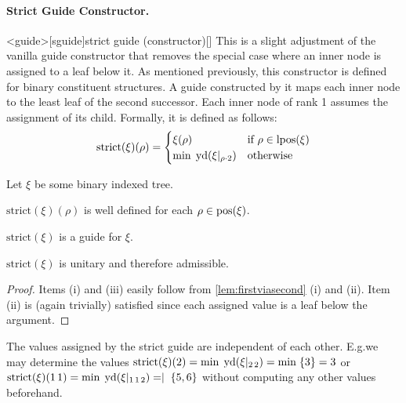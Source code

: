 \documentclass[../../document.tex]{subfiles}
\begin{document}
    \paragraph{Strict Guide Constructor.}<guide>[sguide]{strict guide (constructor)}[]
    This is a slight adjustment of the vanilla guide constructor that removes the special case where an inner node is assigned to a leaf below it.
    As mentioned previously, this constructor is defined for binary constituent structures.
    A guide constructed by it maps each inner node to the least leaf of the second successor.
    Each inner node of rank 1 assumes the assignment of its child.
    Formally, it is defined as follows:
    \[
    \mathrm{strict}(\xi)(\rho) = \begin{cases}
        \xi(\rho)   & \text{if $\rho \in \operatorname{lpos}(\xi)$}\\
        \min\;\operatorname{yd}(\xi|_{\rho\cdot 2}) &\text{otherwise}
    \end{cases}
    \]

    \begin{theorem}
        Let \(\xi\) be some binary indexed tree.
        \begin{compactenum}
            \item \(\mathrm{strict}(\xi)(\rho)\) is well defined for each \(\rho \in \operatorname{pos}(\xi)\).
            \item \(\mathrm{strict}(\xi)\) is a guide for \(\xi\).
            \item \(\mathrm{strict}(\xi)\) is unitary and therefore admissible.
        \end{compactenum}
    \end{theorem}

    \begin{proof}
        Items (i) and (iii) easily follow from \cref{lem:firstviasecond} (i) and (ii).
        Item (ii) is (again trivially) satisfied since each assigned value is a leaf below the argument.
    \end{proof}

    \begin{example}
        The values assigned by the strict guide are independent of each other.
        E.g.\@ we may determine the values \(\mathrm{strict}(\xi)(2) = \min\;\operatorname{yd}(\xi|_{2\,2}) = \min\;\{3\} = 3\) or \(\mathrm{strict}(\xi)(1\,1) = \min\;\operatorname{yd}(\xi|_{1\,1\,2}) = \mid\;\{5,6\}\) without computing any other values beforehand.
    \end{example}
\end{document}
